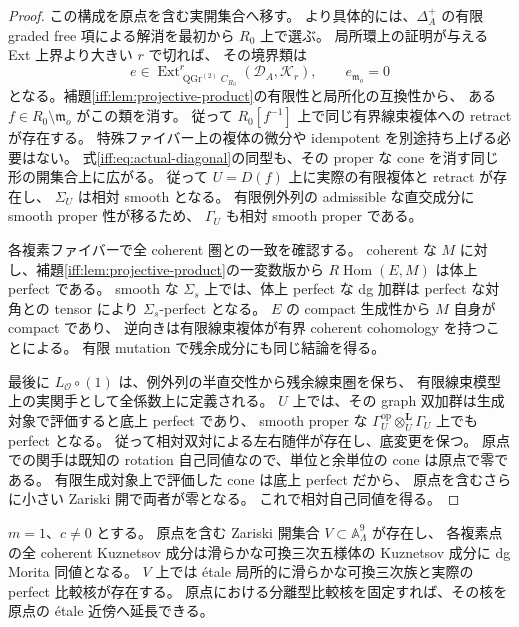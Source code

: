 \begin{proof}
この構成を原点を含む実開集合へ移す。
より具体的には、$\Delta_A^+$ の有限 graded free 項による解消を最初から $R_0$ 上で選ぶ。
局所環上の証明が与える Ext 上界より大きい $r$ で切れば、
その境界類は
\[
 e\in\operatorname{Ext}^r_{\operatorname{QGr}^{(2)}C_{R_0}}
              (\mathcal D_A,\mathcal K_r),\qquad e_{\mathfrak m_o}=0
\]
となる。補題\ref{iff:lem:projective-product}の有限性と局所化の互換性から、
ある $f\in R_0\setminus\mathfrak m_o$ がこの類を消す。
従って $R_0[f^{-1}]$ 上で同じ有界線束複体への retract が存在する。
特殊ファイバー上の複体の微分や idempotent を別途持ち上げる必要はない。
式\eqref{iff:eq:actual-diagonal}の同型も、その proper な cone を消す同じ形の開集合上に広がる。
従って $U=D(f)$ 上に実際の有限複体と retract が存在し、
$\Sigma_U$ は相対 smooth となる。
有限例外列の admissible な直交成分に smooth proper 性が移るため、
$\Gamma_U$ も相対 smooth proper である。

各複素ファイバーで全 coherent 圏との一致を確認する。
coherent な $M$ に対し、補題\ref{iff:lem:projective-product}の一変数版から
$R\operatorname{Hom}(E,M)$ は体上 perfect である。
smooth な $\Sigma_s$ 上では、体上 perfect な dg 加群は
perfect な対角との tensor により $\Sigma_s$-perfect となる。
$E$ の compact 生成性から $M$ 自身が compact であり、
逆向きは有限線束複体が有界 coherent cohomology を持つことによる。
有限 mutation で残余成分にも同じ結論を得る。

最後に $L_{\mathcal O}\circ(1)$ は、例外列の半直交性から残余線束圏を保ち、
有限線束模型上の実関手として全係数上に定義される。
$U$ 上では、その graph 双加群は生成対象で評価すると底上 perfect であり、
smooth proper な $\Gamma_U^{\mathrm{op}}\otimes_U^{\mathbf L}\Gamma_U$ 上でも perfect となる。
従って相対双対による左右随伴が存在し、底変更を保つ。
原点での関手は既知の rotation 自己同値なので、単位と余単位の cone は原点で零である。
有限生成対象上で評価した cone は底上 perfect だから、
原点を含むさらに小さい Zariski 開で両者が零となる。
これで相対自己同値を得る。
\end{proof}

\begin{corollary}
\label{iff:cor:cubic-fivefold-open}
$m=1$、$c\ne0$ とする。
原点を含む Zariski 開集合 $V\subset\mathbb A^9_\Lambda$ が存在し、
各複素点の全 coherent Kuznetsov 成分は滑らかな可換三次五様体の
Kuznetsov 成分に dg Morita 同値となる。
$V$ 上では \'etale 局所的に滑らかな可換三次族と実際の perfect 比較核が存在する。
原点における分離型比較核を固定すれば、その核を原点の \'etale 近傍へ延長できる。
\end{corollary}

